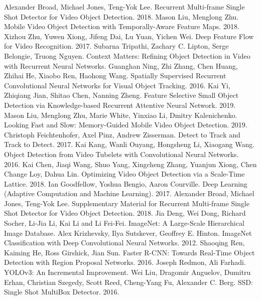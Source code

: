 \documentclass[conference]{IEEEtran}
\begin{document}
\begin{thebibliography}{00}
 Alexander Broad, Michael Jones, Teng-Yok Lee. Recurrent Multi-frame Single Shot Detector for Video Object Detection. 2018.
 Mason Liu, Menglong Zhu. Mobile Video Object Detection with Temporally-Aware Feature Maps. 2018.
 Xizhou Zhu, Yuwen Xiong, Jifeng Dai, Lu Yuan, Yichen Wei. Deep Feature Flow for Video Recognition. 2017.
 Subarna Tripathi, Zachary C. Lipton, Serge Belongie, Truong Nguyen. Context Matters: Refining Object Detection in Video with Recurrent Neural Networks.
 Guanghan Ning, Zhi Zhang, Chen Huang, Zhihai He, Xiaobo Ren, Haohong Wang. Spatially Supervised Recurrent Convolutional Neural Networks for Visual Object Tracking. 2016.
 Kai Yi, Zhiqiang Jian, Shitao Chen, Nanning Zheng. Feature Selective Small Object Detection via Knowledge-based Recurrent Attentive Neural Network. 2019.
 Mason Liu, Menglong Zhu, Marie White, Yinxiao Li, Dmitry Kalenichenko. Looking Fast and Slow: Memory-Guided Mobile Video Object Detection. 2019.
 Christoph Feichtenhofer, Axel Pinz, Andrew Zisserman. Detect to Track and Track to Detect. 2017.
 Kai Kang, Wanli Ouyang, Hongsheng Li, Xiaogang Wang. Object Detection from Video Tubelets with Convolutional Neural Networks. 2016.
 Kai Chen, Jiaqi Wang, Shuo Yang, Xingcheng Zhang, Yuanjun Xiong, Chen Change Loy, Dahua Lin. Optimizing Video Object Detection via a Scale-Time Lattice. 2018.
 Ian Goodfellow, Yoshua Bengio, Aaron Courville. Deep Learning (Adaptive Computation and Machine Learning). 2017.
 Alexander Broad, Michael Jones, Teng-Yok Lee. Supplementary Material for Recurrent Multi-frame Single Shot Detector for Video Object Detection. 2018.
 Jia Deng, Wei Dong, Richard Socher, Li-Jia Li, Kai Li and Li Fei-Fei. ImageNet: A Large-Scale Hierarchical Image Database. 
 Alex Krizhevsky, Ilya Sutskever, Geoffrey E. Hinton. ImageNet Classification with Deep Convolutional Neural Networks. 2012.
 Shaoqing Ren, Kaiming He, Ross Girshick, Jian Sun. Faster R-CNN: Towards Real-Time Object Detection with Region Proposal Networks. 2016. 
 Joseph Redmon, Ali Farhadi. YOLOv3: An Incremental Improvement.
 Wei Liu, Dragomir Anguelov, Dumitru Erhan, Christian Szegedy, Scott Reed, Cheng-Yang Fu, Alexander C. Berg. SSD: Single Shot MultiBox Detector. 2016.
\end{thebibliography}
\vspace{12pt}
\end{document}
